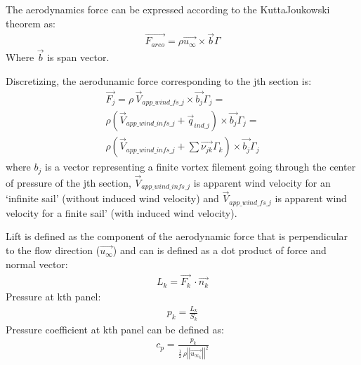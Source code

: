 \documentclass[letterpaper,10pt,english]{jupyterBook}
\begin{document}
\sphinxAtStartPar
The aerodynamics force can be expressed according to the Kutta\sphinxhyphen{}Joukowski theorem as:
\begin{equation*}
\begin{split}
\overrightarrow{F_{areo}} = \rho \overrightarrow{u_{\infty}} \times \overrightarrow{b} \Gamma
\end{split}
\end{equation*}
\sphinxAtStartPar
Where \(\overrightarrow{b}\) is span vector.

\sphinxAtStartPar
Discretizing, the aerodunamic force corresponding to the j\sphinxhyphen{}th section is:
\begin{equation*}
\begin{split}
\overrightarrow{F_{j}}=\rho\,\overrightarrow{V}_{app\_wind\_fs\_j} \times \overrightarrow{b_j}\Gamma_{j} = \\
\rho(\overrightarrow{V}_{app\_wind\_infs\_j} + \overrightarrow{q}_{ind\_j}) \times \overrightarrow{b_j}\Gamma_{j} = \\
\rho(\overrightarrow{V}_{app\_wind\_infs\_j} +
\sum{\overrightarrow{\nu_{jk}}\Gamma_{k}}) \times \overrightarrow{b_j}\Gamma_{j}
\end{split}
\end{equation*}
\sphinxAtStartPar
where \(b_j\) is a vector representing a finite vortex filement going through the center of pressure of the j\sphinxhyphen{}th section, \(\overrightarrow{V}_{app\_wind\_infs\_j}\) is apparent wind velocity for an ‘infinite sail’ (without induced wind velocity) and \(\overrightarrow{V}_{app\_wind\_fs\_j}\) is apparent wind velocity for a finite sail’ (with induced wind velocity).

\sphinxAtStartPar
Lift is defined as the component of the aerodynamic force that is perpendicular to the flow direction (\(\overrightarrow{u_{\infty}}\)) and can is defined as a dot product of force and normal vector:
\begin{equation*}
\begin{split}
L_k=\overrightarrow{F_k}\,\cdot \overrightarrow{n_k}
\end{split}
\end{equation*}
\sphinxAtStartPar
Pressure at k\sphinxhyphen{}th panel:
\begin{equation*}
\begin{split}
p_k=\frac{L_k}{S_k}
\end{split}
\end{equation*}
\sphinxAtStartPar
Pressure coefficient at k\sphinxhyphen{}th panel can be defined as:
\begin{equation*}
\begin{split}
c_p=\frac{p_k}{\frac{1}{2}\, \rho {\left|\left|\overrightarrow{u_{\infty_k}}\right|\right|}^2}
\end{split}
\end{equation*}
\end{document}
